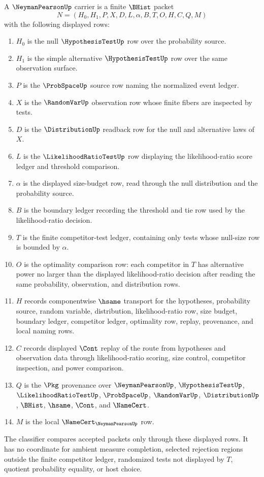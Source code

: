 \begin{definition}
\label{def:neyman-pearson-carrier}
A $\NeymanPearsonUp$ carrier is a finite $\BHist$ packet
$$
N=(H_0,H_1,P,X,D,L,\alpha,B,T,O,H,C,Q,M)
$$
with the following displayed rows:
\begin{enumerate}
\item $H_0$ is the null $\HypothesisTestUp$ row over the probability source.
\item $H_1$ is the simple alternative $\HypothesisTestUp$ row over the same observation surface.
\item $P$ is the $\ProbSpaceUp$ source row naming the normalized event ledger.
\item $X$ is the $\RandomVarUp$ observation row whose finite fibers are inspected by tests.
\item $D$ is the $\DistributionUp$ readback row for the null and alternative laws of $X$.
\item $L$ is the $\LikelihoodRatioTestUp$ row displaying the likelihood-ratio score ledger and threshold comparison.
\item $\alpha$ is the displayed size-budget row, read through the null distribution and the probability source.
\item $B$ is the boundary ledger recording the threshold and tie row used by the likelihood-ratio decision.
\item $T$ is the finite competitor-test ledger, containing only tests whose null-size row is bounded by $\alpha$.
\item $O$ is the optimality comparison row: each competitor in $T$ has alternative power no larger than the displayed likelihood-ratio decision after reading the same probability, observation, and distribution rows.
\item $H$ records componentwise $\hsame$ transport for the hypotheses, probability source, random variable, distribution, likelihood-ratio row, size budget, boundary ledger, competitor ledger, optimality row, replay, provenance, and local naming rows.
\item $C$ records displayed $\Cont$ replay of the route from hypotheses and observation data through likelihood-ratio scoring, size control, competitor inspection, and power comparison.
\item $Q$ is the $\Pkg$ provenance over $\NeymanPearsonUp$, $\HypothesisTestUp$, $\LikelihoodRatioTestUp$, $\ProbSpaceUp$, $\RandomVarUp$, $\DistributionUp$, $\BHist$, $\hsame$, $\Cont$, and $\NameCert$.
\item $M$ is the local $\NameCert_{\NeymanPearsonUp}$ row.
\end{enumerate}
The classifier compares accepted packets only through these displayed rows. It has no coordinate for ambient measure completion, selected rejection regions outside the finite competitor ledger, randomized tests not displayed by $T$, quotient probability equality, or host choice.
\end{definition}

